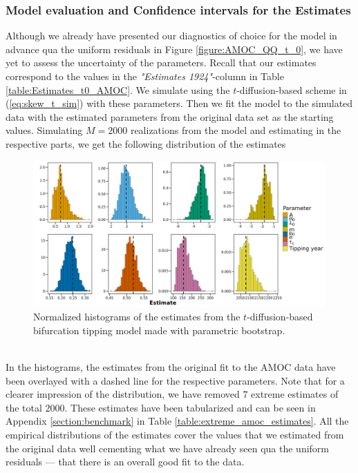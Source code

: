 \subsubsection{Model evaluation and Confidence intervals for the Estimates}
Although we already have presented our diagnostics of choice for the model in advance qua the uniform residuals in Figure \ref{figure:AMOC_QQ_t_0}, we have yet to assess the uncertainty of the parameters. Recall that our estimates correspond to the values in the \textit{"Estimates 1924"}-column in Table \ref{table:Estimates_t0_AMOC}. We simulate using the $t$-diffusion-based scheme in (\ref{eq:skew_t_sim}) with these parameters. Then we fit the model to the simulated data with the estimated parameters from the original data set as the starting values. Simulating $M = 2000$ realizations from the model and estimating in the respective parts, we get the following distribution of the estimates
\begin{figure}[h!]
    \begin{center}
    \includegraphics[scale = .095]{figures/estim_tibble_plot.jpeg}
    \caption{Normalized histograms of the estimates from the $t$-diffusion-based bifurcation tipping model made with parametric bootstrap.}
    \label{figure:AMOC_parametric_bootstrap}
    \end{center}
\end{figure}\\
In the histograms, the estimates from the original fit to the AMOC data have been overlayed with a dashed line for the respective parameters. Note that for a clearer impression of the distribution, we have removed $7$ extreme estimates of the total $2000$. These estimates have been tabularized and can be seen in Appendix \ref{section:benchmark} in Table \ref{table:extreme_amoc_estimates}. All the empirical distributions of the estimates cover the values that we estimated from the original data well cementing what we have already seen qua the uniform residuals — that there is an overall good fit to the data.
